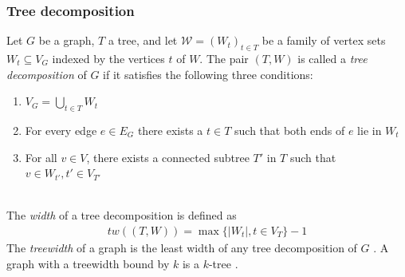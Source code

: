 \subsubsection{Tree decomposition}
Let $G$ be a graph, $T$ a tree, and let $\mathcal{W} = \left(W_t\right)_{t\in T}$ be a family of vertex sets $W_t \subseteq V_G$ indexed by the vertices $t$ of $W$. The pair $(T,W)$ is called a \emph{tree decomposition} of $G$ if it satisfies the following three conditions:
\begin{enumerate}
	\item $V_G = \bigcup_{t\in T}W_t$
	\item For every edge $e\in E_G$ there exists a $t\in T$ such that both ends of $e$ lie in $W_t$
	\item For all $v\in V$, there exists a connected subtree $T'$ in $T$ such that $v \in W_{t'}, t' \in V_{T'}$
\end{enumerate}
\cite[P. 319]{Diestel_GraphTheory}
\\
The \emph{width} of a tree decomposition is defined as 
\begin{align}
	tw((T,W)) = \max\{ |W_t|,t\in V_T \} -1
\end{align}
The \emph{treewidth} of a graph is the least width of any tree decomposition of $G$ \cite[P. 321]{Diestel_GraphTheory}. A graph with a treewidth bound by $k$ is a $k$-tree \cite[P. 5]{k-tree_bounded-treewidth}.
